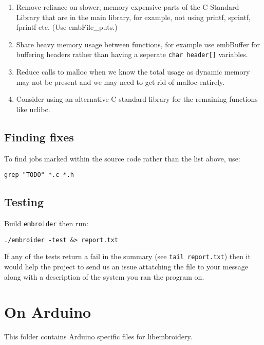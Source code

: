 \documentclass[onesize, a4paper]{refart}
\providecommand{\tightlist}{\setlength{\itemsep}{0pt}\setlength{\parskip}{0pt}}
\begin{document}
\begin{enumerate}
  \begin{enumerate}
  \def\labelenumii{\arabic{enumii}.}
  \tightlist
  \item Remove reliance on slower, memory expensive parts of the C Standard
    Library that are in the main library, for example, not using printf,
    sprintf, fprintf etc. (Use embFile\_puts.)
  \item Share heavy memory usage between functions, for example use
    embBuffer for buffering headers rather than having a seperate
    \texttt{char\ header{[}{]}} variables.
  \item Reduce calls to malloc when we know the total usage as dynamic
    memory may not be present and we may need to get rid of malloc
    entirely.
  \item Consider using an alternative C standard library for the remaining
    functions like uclibc.
  \end{enumerate}
\end{enumerate}

\subsection{Finding fixes}

To find jobs marked within the source code rather than the list above,
use:

\begin{verbatim}
grep "TODO" *.c *.h
\end{verbatim}

\subsection{Testing}

Build \texttt{embroider} then run:

\begin{verbatim}
./embroider -test &> report.txt
\end{verbatim}

If any of the tests return a fail in the summary (see
\texttt{tail\ report.txt}) then it would help the project to send us an
issue attatching the file to your message along with a description of
the system you ran the program on.

\section{On Arduino}

This folder contains Arduino specific files for libembroidery.
\end{document}

